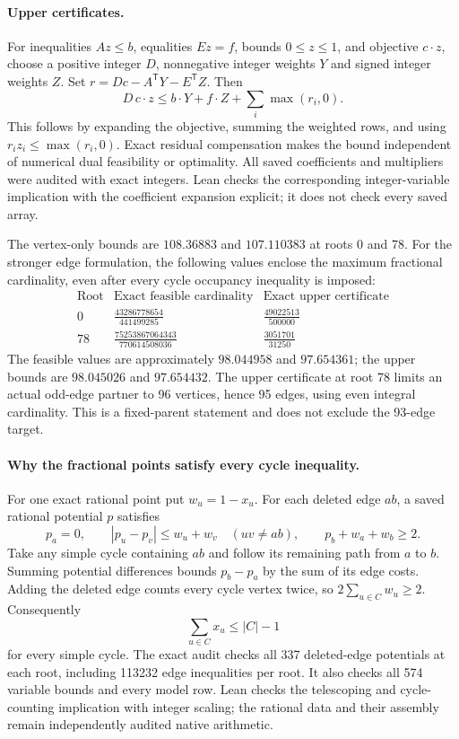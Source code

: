 \documentclass[11pt,a4paper]{article}
\theoremstyle{definition}
\theoremstyle{remark}
\begin{document}
\paragraph{Upper certificates.}
For inequalities $Az\le b$, equalities $Ez=f$, bounds $0\le z\le1$,
and objective $c\cdot z$, choose a positive integer $D$, nonnegative
integer weights $Y$ and signed integer weights $Z$. Set
$r=Dc-A^{\mathsf T}Y-E^{\mathsf T}Z$. Then
\[
D\,c\cdot z\le b\cdot Y+f\cdot Z+\sum_i\max(r_i,0).
\]
This follows by expanding the objective, summing the weighted rows,
and using $r_i z_i\le\max(r_i,0)$. Exact residual compensation makes
the bound independent of numerical dual feasibility or optimality.
All saved coefficients and multipliers were audited with exact integers.
Lean checks the corresponding integer-variable implication with the
coefficient expansion explicit; it does not check every saved array.

The vertex-only bounds are $108.36883$ and $107.110383$ at roots 0 and 78.
For the stronger edge formulation, the following values enclose the
maximum fractional cardinality, even after every cycle occupancy
inequality is imposed:
\[
\begin{array}{c|c|c}
\text{Root}&\text{Exact feasible cardinality}&\text{Exact upper certificate}\\\hline
0&\displaystyle\frac{43286778654}{441499285}
 &\displaystyle\frac{49022513}{500000}\\[6pt]
78&\displaystyle\frac{75253867064343}{770614508036}
 &\displaystyle\frac{3051701}{31250}
\end{array}
\]
The feasible values are approximately $98.044958$ and $97.654361$;
the upper bounds are $98.045026$ and $97.654432$.
The upper certificate at root 78 limits an actual odd-edge partner to
96 vertices, hence 95 edges, using even integral cardinality. This is
a fixed-parent statement and does not exclude the 93-edge target.

\paragraph{Why the fractional points satisfy every cycle inequality.}
For one exact rational point put $w_u=1-x_u$. For each deleted edge
$ab$, a saved rational potential $p$ satisfies
\[
p_a=0,\qquad |p_u-p_v|\le w_u+w_v\quad(uv\ne ab),
\qquad p_b+w_a+w_b\ge2.
\]
Take any simple cycle containing $ab$ and follow its remaining path
from $a$ to $b$. Summing potential differences bounds $p_b-p_a$ by
the sum of its edge costs. Adding the deleted edge counts every
cycle vertex twice, so $2\sum_{u\in C}w_u\ge2$. Consequently
\[
\sum_{u\in C}x_u\le |C|-1
\]
for every simple cycle. The exact audit checks all 337 deleted-edge
potentials at each root, including 113232 edge inequalities per root.
It also checks all 574 variable bounds and every model row.
Lean checks the telescoping and cycle-counting implication with integer
scaling; the rational data and their assembly remain independently
audited native arithmetic.
\end{document}
